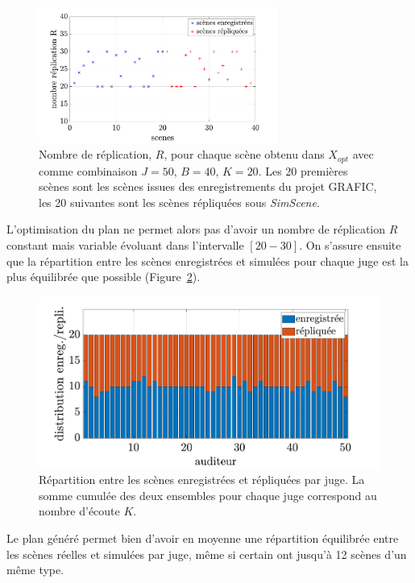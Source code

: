 \begin{figure}[ht]
\centering
\includegraphics[width = 0.7\textwidth]{./figures/test_perceptif/nb_replication.pdf}
\caption{Nombre de réplication, $R$, pour chaque scène obtenu dans $X_{opt}$ avec comme combinaison $J = 50$, $B = 40$, $K = 20$. Les 20 premières scènes sont les scènes issues des enregistrements du projet GRAFIC, les 20 suivantes sont les scènes répliquées sous \textit{SimScene}.}
\label{fig:replication}
\end{figure}

L'optimisation du plan ne permet alors pas d'avoir un nombre de réplication $R$ constant mais variable évoluant dans l'intervalle $\left[20-30 \right]$. On s'assure ensuite que la répartition entre les scènes enregistrées et simulées pour chaque juge est la plus équilibrée que possible (Figure~\ref{fig:repartition}).\\

\begin{figure}[ht]
\centering
\includegraphics[width = .7\textwidth]{./figures/test_perceptif/repartition-real-simulated.pdf}
\caption{Répartition entre les scènes enregistrées et répliquées par juge. La somme cumulée des deux ensembles pour chaque juge correspond au nombre d'écoute $K$.}
\label{fig:repartition}
\end{figure}

Le plan généré permet bien d'avoir en moyenne une répartition équilibrée entre les scènes réelles et simulées par juge, même si certain ont jusqu'à 12 scènes d'un même type.\\

